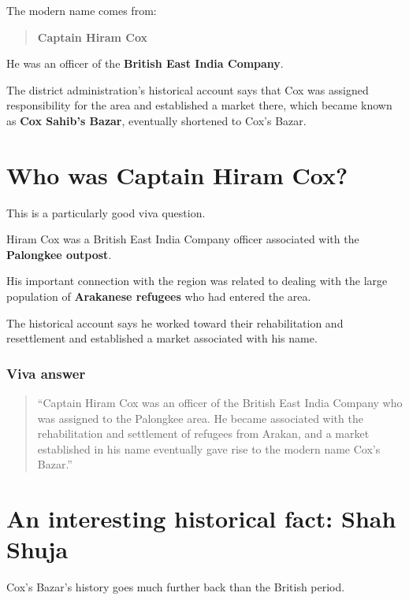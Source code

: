 The modern name comes from:

\begin{quote}
\textbf{Captain Hiram Cox}\\
\end{quote}

He was an officer of the \textbf{British East India Company}.

The district administration's historical account says that Cox was assigned responsibility for the area and established a market there, which became known as \textbf{Cox Sahib's Bazar}, eventually shortened to Cox's Bazar.

\medskip

\section{Who was Captain Hiram Cox?}

This is a particularly good viva question.

Hiram Cox was a British East India Company officer associated with the \textbf{Palongkee outpost}.

His important connection with the region was related to dealing with the large population of \textbf{Arakanese refugees} who had entered the area.

The historical account says he worked toward their rehabilitation and resettlement and established a market associated with his name.

\subsubsection{Viva answer}

\begin{quote}
``Captain Hiram Cox was an officer of the British East India Company who was assigned to the Palongkee area. He became associated with the rehabilitation and settlement of refugees from Arakan, and a market established in his name eventually gave rise to the modern name Cox's Bazar.''\\
\end{quote}

\medskip

\section{An interesting historical fact: Shah Shuja}

Cox's Bazar's history goes much further back than the British period.

